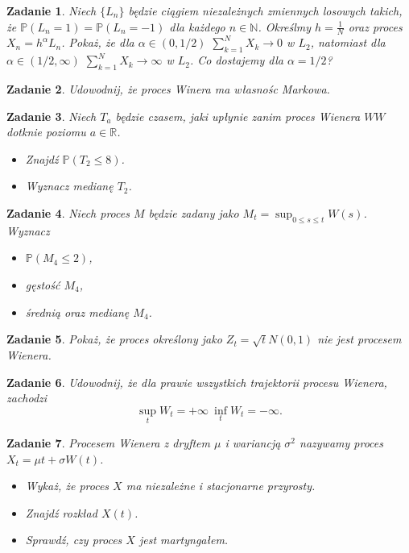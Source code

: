 \documentclass{mwart}
\newtheorem{zd}{Zadanie}
\begin{document}
\begin{zd}
	Niech $\{L_n\}$ będzie ciągiem niezależnych zmiennych losowych takich, że $\mathbb{P}\left(L_n = 1\right) = \mathbb{P}\left(L_n = -1\right)$ dla każdego $n\in\mathbb{N}$. Określmy $h = \frac{1}{N}$ oraz proces $X_n = h^{\alpha}L_n$. Pokaż, że dla $\alpha \in (0,1/2)$ $\sum_{k=1}^NX_k \to 0$ w $L_2$, natomiast dla $\alpha \in (1/2, \infty)$ $\sum_{k=1}^NX_k \to \infty$ w $L_2$. Co dostajemy dla $\alpha = 1/2$?
\end{zd}

\begin{zd}
Udowodnij, że proces Winera ma własnośc Markowa.
\end{zd}

\begin{zd}
Niech $T_a$ będzie czasem, jaki upłynie zanim proces Wienera $WW$ dotknie poziomu $a\in \mathbb{R}$.
\begin{itemize}
\item Znajdź $\mathbb{P}\left(T_2 \leq 8\right)$.
\item Wyznacz medianę $T_2$.
\end{itemize}
\end{zd}

\begin{zd}
Niech proces $M$ będzie zadany jako $M_t = \sup_{0 \leq s \leq t}W(s)$. Wyznacz
\begin{itemize}
\item $\mathbb{P}\left(M_4 \leq 2\right)$,
\item gęstość $M_4$,
\item średnią oraz medianę $M_4$.
\end{itemize}
\end{zd}

\begin{zd}
	Pokaż, że proces określony jako $Z_t = \sqrt{t}N(0,1)$ nie jest procesem Wienera.
\end{zd}
\begin{zd}
	Udowodnij, że dla prawie wszystkich trajektorii procesu Wienera, zachodzi
	\begin{displaymath}
		\sup_tW_t = +\infty\ \inf_tW_t = -\infty.
	\end{displaymath}
\end{zd}

\begin{zd}
Procesem Wienera z dryftem $\mu$ i wariancją $\sigma^2$ nazywamy proces $X_t = \mu t+ \sigma W(t)$.
\begin{itemize}
\item Wykaż, że proces $X$ ma niezależne i stacjonarne przyrosty.
\item Znajdź rozkład $X(t)$.
\item Sprawdź, czy proces $X$ jest martyngałem.
\end{itemize}
\end{zd}
\end{document}
